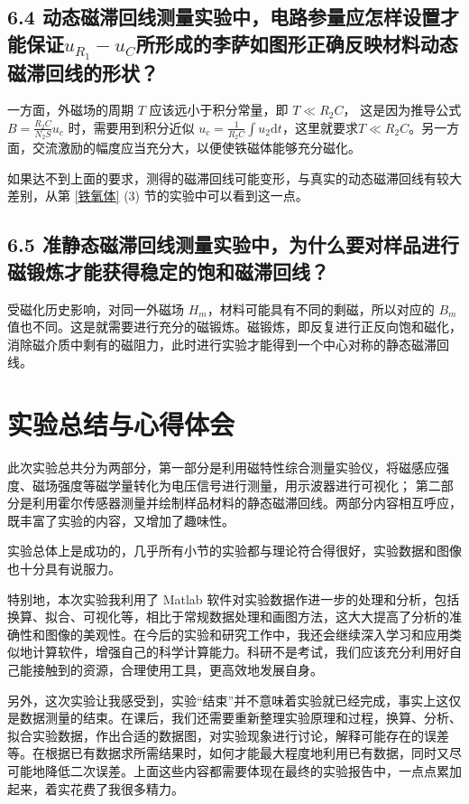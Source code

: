 \documentclass[UTF8]{article}
\theoremstyle{MyLineTheoremStyle} %
\theoremstyle{MyBlockTheoremStyle} %
\theoremstyle{MySubsubsectionStyle} %
\begin{document}
\subsection*{6.4 动态磁滞回线测量实验中，电路参量应怎样设置才能保证$u_{R_1}-u_C$所形成的李萨如图形正确反映材料动态磁滞回线的形状？}

一方面，外磁场的周期 $T$ 应该远小于积分常量，即 $T \ll R_2C$，
这是因为推导公式 $B=\frac{R_2 C}{N_2 S}u_c$ 时，需要用到积分近似 $u_c=\frac{1}{R_2 C}\int u_2\mathrm d t$，这里就要求$T \ll R_2C$。另一方面，交流激励的幅度应当充分大，以便使铁磁体能够充分磁化。

如果达不到上面的要求，测得的磁滞回线可能变形，与真实的动态磁滞回线有较大差别，从第 \ref{铁氧体} (3) 节的实验中可以看到这一点。

\subsection*{6.5 准静态磁滞回线测量实验中，为什么要对样品进行磁锻炼才能获得稳定的饱和磁滞回线？}

受磁化历史影响，对同一外磁场 $H_m$，材料可能具有不同的剩磁，所以对应的 $B_m$ 值也不同。这是就需要进行充分的磁锻炼。磁锻炼，即反复进行正反向饱和磁化，消除磁介质中剩有的磁阻力，此时进行实验才能得到一个中心对称的静态磁滞回线。


\section{实验总结与心得体会}

此次实验总共分为两部分，第一部分是利用磁特性综合测量实验仪，将磁感应强度、磁场强度等磁学量转化为电压信号进行测量，用示波器进行可视化；
第二部分是利用霍尔传感器测量并绘制样品材料的静态磁滞回线。两部分内容相互呼应，既丰富了实验的内容，又增加了趣味性。

实验总体上是成功的，几乎所有小节的实验都与理论符合得很好，实验数据和图像也十分具有说服力。

特别地，本次实验我利用了 Matlab 软件对实验数据作进一步的处理和分析，包括换算、拟合、可视化等，相比于常规数据处理和画图方法，这大大提高了分析的准确性和图像的美观性。在今后的实验和研究工作中，我还会继续深入学习和应用类似地计算软件，增强自己的科学计算能力。科研不是考试，我们应该充分利用好自己能接触到的资源，合理使用工具，更高效地发展自身。

另外，这次实验让我感受到，实验“结束”并不意味着实验就已经完成，事实上这仅是数据测量的结束。在课后，我们还需要重新整理实验原理和过程，换算、分析、拟合实验数据，作出合适的数据图，对实验现象进行讨论，解释可能存在的误差等。在根据已有数据求所需结果时，如何才能最大程度地利用已有数据，同时又尽可能地降低二次误差。上面这些内容都需要体现在最终的实验报告中，一点点累加起来，着实花费了我很多精力。
\end{document}
